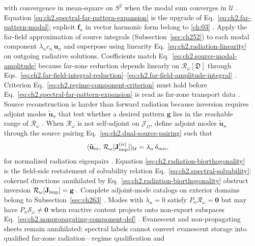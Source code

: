 with convergence in mean-square on \(S^{2}\) when the modal sum converges in
\(\mathcal{U}\) \cite{stratton1941}. Equation
\eqref{eq:ch2.spectral-far-pattern-expansion} is the upgrade
of Eq.~\eqref{eq:ch2.far-pattern-modal}; explicit \(\mathbf{f}_n\) in vector
harmonic form belong to \ref{ch:03} \cite{stratton1941}.
Apply the far-field approximation of source integrals (Subsection~\ref{sec:ch252}) to each modal component
\(\lambda_n c_n\,\mathbf{u}_n\) and superpose using linearity
Eq.~\eqref{eq:ch2.radiation-linearity} on outgoing radiative solutions. Coefficients match
Eq.~\eqref{eq:ch2.source-modal-amplitude} because far-zone reduction depends linearly on
\(\mathcal{R}_\omega[\mathfrak{D}]\) through
Eqs.~\eqref{eq:ch2.far-field-integral-reduction}--\eqref{eq:ch2.far-field-amplitude-integral}
\cite{stratton1941}. Criterion Eq.~\eqref{eq:ch2.regime-component-criterion} must hold before
Eq.~\eqref{eq:ch2.spectral-far-pattern-expansion} is read as far-zone transport data
\cite{harrington2001}. Source reconstruction is harder than forward radiation because inversion requires adjoint modes
$\widetilde{\mathbf{u}}_n$ that test whether a desired pattern $\mathbf{g}$ lies in the
reachable range of $\mathcal{R}_\omega$ \cite{stratton1941}. When \(\mathcal{R}_\omega\) is not self-adjoint on \(\mathcal{J}_\Omega\), define adjoint
modes \(\widetilde{\mathbf{u}}_n\) through the source pairing
Eq.~\eqref{eq:ch2.dual-source-pairing} such that
\begin{equation}
\label{eq:ch2.radiation-biorthogonality}
\langle \widetilde{\mathbf{u}}_m,\,\mathcal{R}_\omega[\mathbf{J}_{\mathrm{imp}}^{(n)}]\rangle_{\mathcal{U}}
=
\lambda_n\,\delta_{mn},
\end{equation}
for normalized radiation eigenpairs \cite{stratton1941}. Equation
\eqref{eq:ch2.radiation-biorthogonality} is the field-side restatement of solvability relation
Eq.~\eqref{eq:ch2.spectral-solvability}: cokernel directions annihilated by
Eq.~\eqref{eq:ch2.radiation-biorthogonality} obstruct inversion
\(\mathcal{R}_\omega[\mathbf{J}_{\mathrm{imp}}]=\mathbf{g}\) \cite{stratton1941}. Complete adjoint-mode catalogs
on exterior domains belong to Subsection~\ref{sec:ch263} \cite{harrington2001}.
Modes with \(\lambda_n=0\) satisfy \(P_n\mathcal{R}_\omega=\mathbf{0}\) but may have
\(P_n\mathcal{S}_\omega\neq\mathbf{0}\) when reactive content projects onto non-export
subspaces Eq.~\eqref{eq:ch2.nonpropagating-component-def}
\cite{stratton1941}. Evanescent and non-propagating sheets remain annihilated: spectral labels
cannot convert evanescent storage into qualified far-zone radiation---regime qualification and

